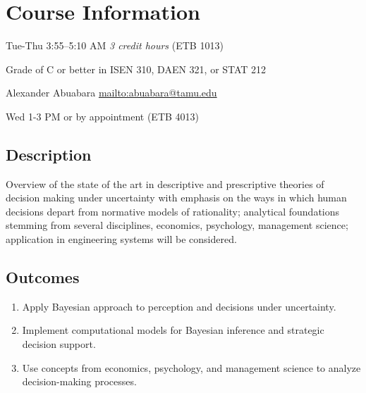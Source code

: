 \documentclass[10pt]{article}
\begin{document}
\title{}
\author{} %
\date{}
\maketitle
\vspace{-7.5em}

\section*{Course Information}
\begin{description}[nosep,leftmargin=0.5in]
\item[Time (Location)] Tue-Thu 3:55--5:10 AM \emph{3 credit hours} (ETB 1013)
\item[Prerequisites] Grade of C or better in ISEN 310, DAEN 321, or STAT 212
\item[Instructor] Alexander Abuabara \url{mailto:abuabara@tamu.edu}
\item[Course office hours (location)] Wed 1-3 PM or by appointment (ETB 4013)
\end{description}

\subsection*{Description}
Overview of the state of the art in descriptive and prescriptive theories 
of decision making under uncertainty with emphasis on the ways in which human 
decisions depart from normative models of rationality; analytical foundations 
stemming from several disciplines, economics, psychology, management science; 
application in engineering systems will be considered.

\subsection*{Outcomes}
\begin{enumerate}[leftmargin=*,nosep]
\item Apply Bayesian approach to perception and decisions under uncertainty.
\item Implement computational models for Bayesian inference and strategic decision support.
\item Use concepts from economics, psychology, and management science to analyze decision-making processes.
\end{enumerate}
\end{document}
